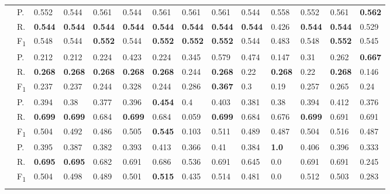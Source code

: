 \begin{tabularx}{\hsize}{p{1.3em}l Z  Z  Z  Z  Z  Z  Z  Z  Z  Z  Z  Z }
    & P.    & 0.552    & 0.544    & 0.561    & 0.544    & 0.561    & 0.561    & 0.561    & 0.544    & 0.558    & 0.552    & 0.561    & \textbf{ 0.562 } \\
    & R.    & \textbf{ 0.544 }    & \textbf{ 0.544 }    & \textbf{ 0.544 }    & \textbf{ 0.544 }    & \textbf{ 0.544 }    & \textbf{ 0.544 }    & \textbf{ 0.544 }    & \textbf{ 0.544 }    & 0.426    & \textbf{ 0.544 }    & \textbf{ 0.544 }    & 0.529 \\
    & F\textsubscript{1}    & 0.548    & 0.544    & \textbf{ 0.552 }    & 0.544    & \textbf{ 0.552 }    & \textbf{ 0.552 }    & \textbf{ 0.552 }    & 0.544    & 0.483    & 0.548    & \textbf{ 0.552 }    & 0.545 \\
     \midrule {}

    & P.    & 0.212    & 0.212    & 0.224    & 0.423    & 0.224    & 0.345    & 0.579    & 0.474    & 0.147    & 0.31    & 0.262    & \textbf{ 0.667 } \\
    & R.    & \textbf{ 0.268 }    & \textbf{ 0.268 }    & \textbf{ 0.268 }    & \textbf{ 0.268 }    & \textbf{ 0.268 }    & 0.244    & \textbf{ 0.268 }    & 0.22    & \textbf{ 0.268 }    & 0.22    & \textbf{ 0.268 }    & 0.146 \\
    & F\textsubscript{1}    & 0.237    & 0.237    & 0.244    & 0.328    & 0.244    & 0.286    & \textbf{ 0.367 }    & 0.3    & 0.19    & 0.257    & 0.265    & 0.24 \\
     \midrule {}

    & P.    & 0.394    & 0.38    & 0.377    & 0.396    & \textbf{ 0.454 }    & 0.4    & 0.403    & 0.381    & 0.38    & 0.394    & 0.412    & 0.376 \\
    & R.    & \textbf{ 0.699 }    & \textbf{ 0.699 }    & 0.684    & \textbf{ 0.699 }    & 0.684    & 0.059    & \textbf{ 0.699 }    & 0.684    & 0.676    & \textbf{ 0.699 }    & 0.691    & 0.691 \\
    & F\textsubscript{1}    & 0.504    & 0.492    & 0.486    & 0.505    & \textbf{ 0.545 }    & 0.103    & 0.511    & 0.489    & 0.487    & 0.504    & 0.516    & 0.487 \\
     \midrule {}

    & P.    & 0.395    & 0.387    & 0.382    & 0.393    & 0.413    & 0.366    & 0.41    & 0.384    & \textbf{ 1.0 }    & 0.406    & 0.396    & 0.333 \\
    & R.    & \textbf{ 0.695 }    & \textbf{ 0.695 }    & 0.682    & 0.691    & 0.686    & 0.536    & 0.691    & 0.645    & 0.0    & 0.691    & 0.691    & 0.245 \\
    & F\textsubscript{1}    & 0.504    & 0.498    & 0.489    & 0.501    & \textbf{ 0.515 }    & 0.435    & 0.514    & 0.481    & 0.0    & 0.512    & 0.503    & 0.283 \\
     \midrule {}


\end{tabularx}

